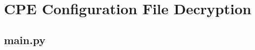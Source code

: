 \section{CPE Configuration File Decryption}
\label{appendix:cpe_config_file_dec}

\subsection{main.py}

